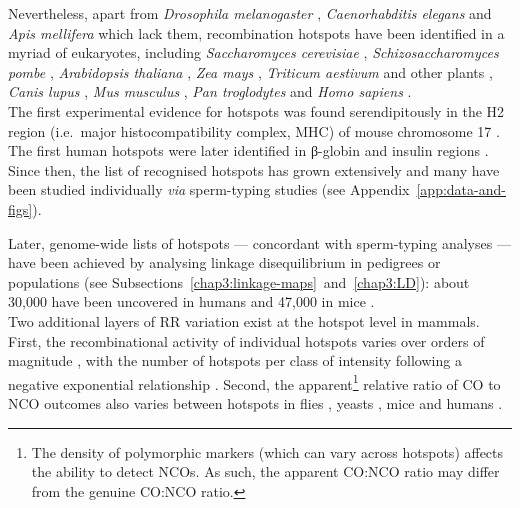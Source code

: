 Nevertheless, apart from \textit{Drosophila melanogaster} \citep{comeron2012many,manzano-winkler2013how}, \textit{Caenorhabditis elegans} \citep{kaur2014crossover} and \textit{Apis mellifera} \citep{mougel2014highresolution,wallberg2015extreme} which lack them, recombination hotspots have been identified in a myriad of eukaryotes, including \textit{Saccharomyces cerevisiae} \citep{sun1989doublestrand,lichten1995meiotic}, \textit{Schizosaccharomyces pombe} \citep{steiner2005natural,cromie2007discrete}, \textit{Arabidopsis thaliana} \citep{drouaud2006variation}, \textit{Zea mays} \citep{brown1991recombination,dooner1997recombination,yao2002molecular,fu2002recombination}, \textit{Triticum aestivum} \citep{saintenac2011variation} and other plants \citep{mezard2006meiotic}, \textit{Canis lupus} \citep{axelsson2012death}, \textit{Mus musculus} \citep{guillon2002initiation,kauppi2007meiotic,smagulova2011genomewide}, \textit{Pan troglodytes} \citep{winckler2005comparison,auton2012finescale} and \textit{Homo sapiens} \citep{jeffreys2001intensely,myers2005finescale}.\\


The first experimental evidence for hotspots was found serendipitously in the H2 region (i.e.\ major histocompatibility complex, MHC) of mouse chromosome 17 \citep{steinmetz1982molecular}.
The first human hotspots were later identified in \textgreek{β}-globin and insulin regions \citep{chakravarti1984nonuniform,chakravarti1986evidence}. 
Since then, the list of recognised hotspots has grown extensively \citep[reviewed in][]{arnheim2007mammalian,paigen2010mammalian} and many have been studied individually \textit{via} sperm-typing studies \citep[e.g.\ ][]{hubert1994high,jeffreys2001intensely,schneider2002direct} (see Appendix~\ref{app:data-and-figs}).

Later, genome-wide lists of hotspots — concordant with sperm-typing analyses \citep[e.g.][]{tiemann-boege2006highresolution} — have been achieved by analysing linkage disequilibrium in pedigrees or populations (see Subsections~\ref{chap3:linkage-maps}~and~\ref{chap3:LD}): about 30,000 have been uncovered in humans \citep{myers2005finescale,theinternationalhapmapconsortium2007seconda} and 47,000 in mice \citep{brunschwig2012finescale}.\\


Two additional layers of RR variation exist at the hotspot level in mammals.
First, the recombinational activity of individual hotspots varies over orders of magnitude \citep{jeffreys2001intensely,kauppi2004where,paigen2008recombinational}, with the number of hotspots per class of intensity following a negative exponential relationship \citep{paigen2010mammalian}.
Second, the apparent\footnote{The density of polymorphic markers (which can vary across hotspots) affects the ability to detect NCOs. As such, the apparent CO:NCO ratio may differ from the genuine CO:NCO ratio.} relative ratio of CO to NCO outcomes also varies between hotspots in flies \citep{singh2012classical}, yeasts \citep{mancera2008highresolution}, mice \citep{paigen2008recombinational} and humans \citep{jeffreys2004intense}.

